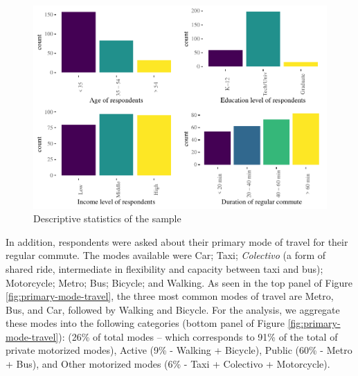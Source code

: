\documentclass[]{elsarticle} %
\makeatletter
\def\maxwidth{\ifdim\Gin@nat@width>\linewidth\linewidth
\else\Gin@nat@width\fi}
\let\Oldincludegraphics\includegraphics
\renewcommand{\includegraphics}[1]{\Oldincludegraphics[width=\maxwidth]{#1}}
\makeatother
\begin{document}
\begin{figure}
\centering
\includegraphics{Dissonance_Santiago_v2_files/figure-latex/plot-descriptive-statistics-1.pdf}
\caption{\label{fig:descriptive-statistics}Descriptive statistics of the
sample}
\end{figure}

In addition, respondents were asked about their primary mode of travel
for their regular commute. The modes available were Car; Taxi;
\emph{Colectivo} (a form of shared ride, intermediate in flexibility and
capacity between taxi and bus); Motorcycle; Metro; Bus; Bicycle; and
Walking. As seen in the top panel of Figure
\ref{fig:primary-mode-travel}, the three most common modes of travel are
Metro, Bus, and Car, followed by Walking and Bicycle. For the analysis,
we aggregate these modes into the following categories (bottom panel of
Figure \ref{fig:primary-mode-travel}): (26\% of total modes -- which
corresponds to 91\% of the total of private motorized modes), Active
(9\% - Walking + Bicycle), Public (60\% - Metro + Bus), and Other
motorized modes (6\% - Taxi + Colectivo + Motorcycle).
\end{document}
